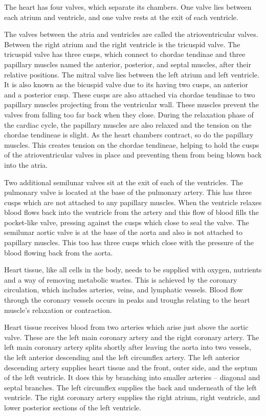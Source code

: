 \documentclass[]{book}
\begin{document}
The heart has four valves, which separate its chambers. One valve lies between each atrium and ventricle, and one valve rests at the exit of each ventricle.

The valves between the atria and ventricles are called the atrioventricular valves. Between the right atrium and the right ventricle is the tricuspid valve. The tricuspid valve has three cusps, which connect to chordae tendinae and three papillary muscles named the anterior, posterior, and septal muscles, after their relative positions. The mitral valve lies between the left atrium and left ventricle. It is also known as the bicuspid valve due to its having two cusps, an anterior and a posterior cusp. These cusps are also attached via chordae tendinae to two papillary muscles projecting from the ventricular wall. These muscles prevent the valves from falling too far back when they close. During the relaxation phase of the cardiac cycle, the papillary muscles are also relaxed and the tension on the chordae tendineae is slight. As the heart chambers contract, so do the papillary muscles. This creates tension on the chordae tendineae, helping to hold the cusps of the atrioventricular valves in place and preventing them from being blown back into the atria.

Two additional semilunar valves sit at the exit of each of the ventricles. The pulmonary valve is located at the base of the pulmonary artery. This has three cusps which are not attached to any papillary muscles. When the ventricle relaxes blood flows back into the ventricle from the artery and this flow of blood fills the pocket-like valve, pressing against the cusps which close to seal the valve. The semilunar aortic valve is at the base of the aorta and also is not attached to papillary muscles. This too has three cusps which close with the pressure of the blood flowing back from the aorta.

Heart tissue, like all cells in the body, needs to be supplied with oxygen, nutrients and a way of removing metabolic wastes. This is achieved by the coronary circulation, which includes arteries, veins, and lymphatic vessels. Blood flow through the coronary vessels occurs in peaks and troughs relating to the heart muscle's relaxation or contraction.

Heart tissue receives blood from two arteries which arise just above the aortic valve. These are the left main coronary artery and the right coronary artery. The left main coronary artery splits shortly after leaving the aorta into two vessels, the left anterior descending and the left circumflex artery. The left anterior descending artery supplies heart tissue and the front, outer side, and the septum of the left ventricle. It does this by branching into smaller arteries -- diagonal and septal branches. The left circumflex supplies the back and underneath of the left ventricle. The right coronary artery supplies the right atrium, right ventricle, and lower posterior sections of the left ventricle.
\end{document}
